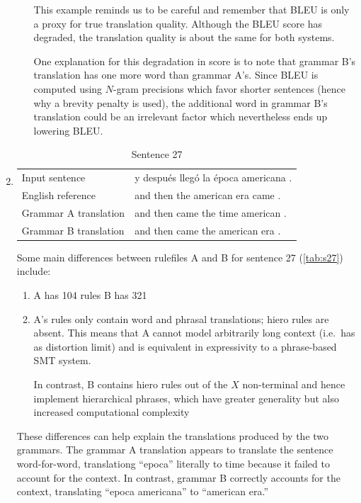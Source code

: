 \documentclass[a4paper,oneside,reqno]{amsart}
\begin{document}
\begin{enumerate}[label=\arabic*.]
\begin{enumerate}[label=(\alph*)]
        This example reminds us to be careful and remember that BLEU is only a
        proxy for true translation quality. Although the BLEU score has degraded,
        the translation quality is about the same for both systems.

        One explanation for this degradation in score is to note that grammar B's
        translation has one more word than grammar A's. Since BLEU is computed using
        $N$-gram precisions which favor shorter sentences (hence why a brevity penalty
        is used), the additional word in grammar B's translation could be an irrelevant
        factor which nevertheless ends up lowering BLEU.
    \end{enumerate}

  \item
    \begin{table}[h!]
      \begin{tabular}{p{5cm}p{10cm}}
        Input sentence & y después llegó la época americana .  \\
            English reference & and then the american era came .  \\
            Grammar A translation & and then came the time american .  \\
            Grammar B translation & and then came the american era .  \\
      \end{tabular}
          \caption{Sentence 27}
          \label{tab:s27}
    \end{table}

    Some main differences between rulefiles A and B for sentence 27 (\autoref{tab:s27}) include:
    \begin{enumerate}
      \item A has 104 rules B has 321
      \item A's rules only contain word and phrasal translations; hiero rules
        are absent.  This means that A cannot model arbitrarily long context
        (i.e.\ has as distortion limit) and is equivalent in expressivity to a
        phrase-based SMT system.

        In contrast, B contains hiero rules out of the $X$ non-terminal and
        hence implement hierarchical phrases, which have greater generality
        but also increased computational complexity
    \end{enumerate}

    These differences can help explain the translations produced by the two
    grammars.  The grammar A translation appears to translate the sentence
    word-for-word, translationg ``epoca'' literally to time because it failed
    to account for the context. In contrast, grammar B correctly accounts for
    the context, translating ``epoca americana'' to ``american era.''


\end{enumerate}
\end{document}
